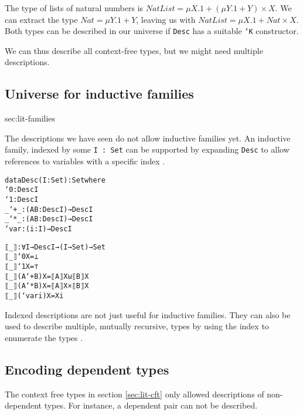 \begin{example}
  The type of lists of natural numbers is $NatList = μX. 1 + (μY. 1 +
  Y) × X$.
  We can extract the type $Nat = μY. 1 + Y$, leaving us with $NatList
  = μX. 1 + Nat × X$.
  Both types can be described in our universe if \texttt{Desc} has a
  suitable \texttt{`K} constructor.
\end{example}

We can thus describe all context-free types, but we might need
multiple descriptions.

\subsection{Universe for inductive families}{sec:lit-families}

The descriptions we have seen do not allow inductive families yet.
An inductive family, indexed by some \texttt{I : Set} can be supported
by expanding \texttt{Desc} to allow references to variables with a
specific index \cite{chapman10}.

\begin{alltt}
  data Desc (I : Set) : Set where
  `0 : Desc I
  `1 : Desc I
  _`+_ : (A B : Desc I) → Desc I
  _`*_ : (A B : Desc I) → Desc I
  `var : (i : I) → Desc I

  ⟦_⟧ : ∀ {I} → Desc I → (I → Set) → Set
  ⟦_⟧ `0 X = ⊥
  ⟦_⟧ `1 X = ⊤
  ⟦_⟧ (A `+ B) X = ⟦ A ⟧ X ⊎ ⟦ B ⟧ X
  ⟦_⟧ (A `* B) X = ⟦ A ⟧ X × ⟦ B ⟧ X
  ⟦_⟧ (`var i) X = X i
\end{alltt}


Indexed descriptions are not just useful for inductive families.
They can also be used to describe multiple, mutually recursive,
types by using the index to enumerate the types \cite{yakushev09}.

\subsection{Encoding dependent types}

The context free types in section \ref{sec:lit-cft} only allowed
descriptions of non-dependent types.
For instance, a dependent pair can not be described.



